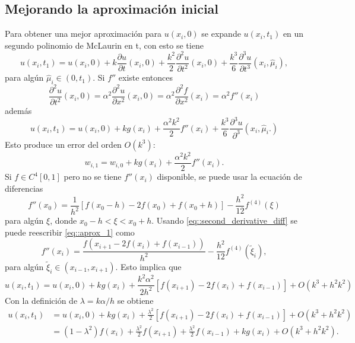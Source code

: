 \documentclass[a4paper]{article}
\begin{document}
\subsection{Mejorando la aproximación inicial}
Para obtener una mejor aproximación para $u(x_i,0)$ se expande $u(x_i,t_1)$ en un segundo polinomio de McLaurin en t, con esto se tiene
\begin{equation}
u(x_i,t_1)=u(x_i,0)+k\frac{\partial u}{\partial t}(x_i,0)+\frac{k^2}{2}\frac{\partial^2 u}{\partial t^2}(x_i,0)+\frac{k^3}{6}\frac{\partial^3 u}{\partial t^3}(x_i,\hat{\mu}_i),
\end{equation}
para algún $\hat{\mu}_i \in (0,t_1)$. Si $f''$ existe entonces 
\begin{equation}
\frac{\partial^2 u}{\partial t^2}(x_i,0)=\alpha^2 \frac{\partial^2 u}{\partial x^2}(x_i,0)=\alpha^2\frac{\partial^2 f}{\partial x^2}(x_i)=\alpha^2 f''(x_i)
\end{equation}
además
\begin{equation}
u(x_i,t_1)=u(x_i,0)+kg(x_i)+\frac{\alpha^2 k^2}{2}f''(x_i)+\frac{k^3}{6}\frac{\partial ^3 u}{\partial ^3}(x_i,\hat{\mu}_i.)
\end{equation}
Esto produce un error del orden $O(k^3)$:
\begin{equation}\label{eq::aprox_1}
w_{i,1}=w_{i,0}+kg(x_i)+\frac{\alpha^2 k^2}{2}f''(x_i).
\end{equation}
Si $f \in C^4[0,1]$ pero no se tiene $f''(x_i)$ disponible, se puede usar la ecuación de diferencias  
\begin{equation}\label{eq::second_derivative_diff}
f''(x_0)=\frac{1}{h^2}[f(x_0-h)-2f(x_0)+f(x_0+h)]-\frac{h^2}{12}f^{(4)}(\xi)
\end{equation}
para algún $\xi$, donde $x_0-h<\xi<x_0+h$. Usando \ref{eq::second_derivative_diff} se puede reescribir \ref{eq::aprox_1} como 
\begin{equation}
f''(x_i)=\frac{f(x_{i+1}-2f(x_i)+f(x_{i-1}))}{h^2}-\frac{h^2}{12}f^{(4)}(\tilde{\xi}_i),
\end{equation}
para algún $\tilde{\xi}_i \in (x_{i-1},x_{i+1})$. Esto implica que 
\begin{equation}
u(x_i,t_1)=u(x_i,0)+kg(x_i)+\frac{k^2 \alpha^2}{2h^2}[f(x_{i+1})-2f(x_i)+f(x_{i-1})]+O(k^3 +h^2k^2)
\end{equation}
Con la definición de $\lambda=k\alpha/h$ se obtiene
\begin{equation}
\begin{aligned}
u(x_i,t_1)&=u(x_i,0)+kg(x_i)+\frac{\lambda^2}{2}[f(x_{i+1})-2f(x_i)+f(x_{i-1})]+O(k^3 +h^2k^2)\\
&=(1-\lambda^2)f(x_i)+\frac{\lambda^2}{2}f(x_{i+1})+\frac{\lambda^2}{2}f(x_{i-1})+kg(x_i)+O(k^3 +h^2k^2).
\end{aligned}
\end{equation}
\end{document}

